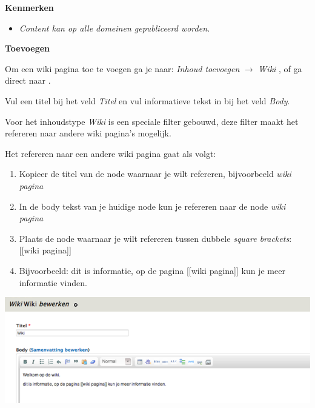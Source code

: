 \textbf{Kenmerken}

\begin{itemize}
\item \emph{Content kan op alle domeinen gepubliceerd worden.}
\end{itemize}

\textbf{Toevoegen}

Om een wiki pagina toe te voegen ga je naar: \emph{Inhoud toevoegen} $\rightarrow$ \emph{Wiki} , of ga direct naar .

Vul een titel bij het veld \emph{Titel} en vul informatieve tekst in bij het veld \emph{Body}.

Voor het inhoudstype \emph{Wiki} is een speciale filter gebouwd, deze filter maakt het refereren naar andere wiki pagina's mogelijk. 

Het refereren naar een andere wiki pagina gaat als volgt: 

\begin{enumerate}
\item Kopieer de titel van de node waarnaar je wilt refereren, bijvoorbeeld \emph{wiki pagina}
\item In de body tekst van je huidige node kun je refereren naar de node \emph{wiki pagina}
\item Plaats de node waarnaar je wilt refereren tussen dubbele \emph{square brackets}: [[wiki pagina]]
\item Bijvoorbeeld: dit is informatie, op de pagina [[wiki pagina]] kun je meer informatie vinden.
\end{enumerate}

\bigskip

\begin{center}
	\includegraphics[width=\textwidth]{img/wiki.png}
\end{center}